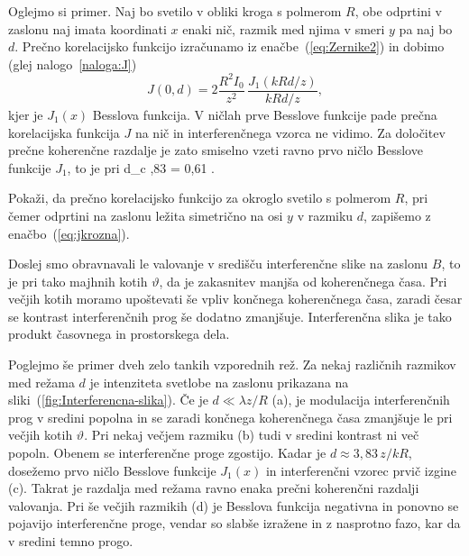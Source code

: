 Oglejmo si primer. Naj bo svetilo v obliki kroga 
s polmerom $R$, obe odprtini v zaslonu naj imata koordinati $x$ enaki nič, razmik
med njima v smeri $y$ pa naj bo $d$. 
Prečno korelacijsko funkcijo izračunamo iz enačbe~(\ref{eq:Zernike2}) in dobimo 
(glej nalogo~\ref{naloga:J})
\begin{equation}
J(0,d)=2\frac{R^{2}I_{0}}{z^{2}}\,\frac{J_{1}(kRd/z)}{kRd/z},
\label{eq:jkrozna}
\end{equation}
kjer je $J_{1}(x)$ Besslova funkcija. V ničlah prve Besslove funkcije
pade prečna korelacijska funkcija $J$ na nič in interferenčnega vzorca ne vidimo. 
Za določitev prečne koherenčne razdalje je zato smiselno vzeti ravno prvo ničlo Besslove funkcije
$J_1$, to je pri
\beq
\label{eq:okroglo_svetilo}
d_{c} ,83  = 0,61 .
\eeq
\begin{definition}
\label{naloga:J}
Pokaži, da prečno korelacijsko funkcijo za okroglo svetilo s polmerom $R$, pri čemer
odprtini na zaslonu ležita simetrično na osi $y$ v razmiku $d$, zapišemo z enačbo~(\ref{eq:jkrozna}). 
\end{definition}

Doslej smo obravnavali le valovanje v središču interferenčne slike na
zaslonu $B$, to je pri tako majhnih kotih $\vartheta$, da je zakasnitev
manjša od koherenčnega časa. Pri večjih kotih moramo upoštevati še
vpliv končnega koherenčnega časa, zaradi česar se kontrast interferenčnih
prog še dodatno zmanjšuje. Interferenčna slika je 
tako produkt časovnega in prostorskega dela. 

Poglejmo še primer dveh zelo tankih vzporednih rež. 
Za nekaj različnih razmikov med režama $d$ je intenziteta
svetlobe na zaslonu prikazana na sliki~(\ref{fig:Interferencna-slika}).
Če je $d\ll\lambda z/R$ (a), je modulacija interferenčnih prog v sredini
popolna in se zaradi končnega koherenčnega časa zmanjšuje le pri večjih
kotih $\vartheta$. Pri nekaj večjem razmiku (b) tudi v sredini kontrast
ni več popoln. Obenem se interferenčne proge zgostijo. Kadar je $d\approx 3,83\,z/kR$,
dosežemo prvo ničlo Besslove funkcije $J_{1}(x)$ in interferenčni vzorec
prvič izgine (c). Takrat je razdalja med režama ravno enaka prečni
koherenčni razdalji valovanja. Pri še večjih razmikih (d) 
je Besslova funkcija negativna in ponovno se pojavijo interferenčne proge, 
vendar so slabše izražene in z nasprotno fazo, kar da v sredini temno progo. 


